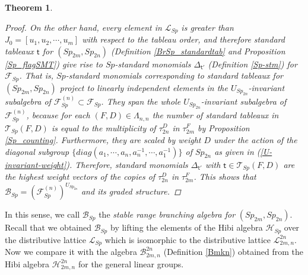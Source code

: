 \documentclass[11pt]{amsart}
\numberwithin{equation}{subsection}
\newtheorem{theorem}{Theorem}[subsection]
\begin{document}
\begin{theorem}
\begin{proof}
On the other hand, every element in $\mathcal{L}_{Sp}$ is greater than 
$J_{0}=[u_1,u_2,\cdots ,u_m]$ with respect to the tableau order, and therefore standard tableaux 
$\mathsf{t}$ for $({Sp}_{2m},{Sp}_{2n})$ (Definition \ref{BrSp_standardtab} and 
Proposition \ref{Sp_flagSMT}) give rise to ${Sp}$-standard monomials $\Delta_{\mathsf{t}'}$ 
(Definition \ref{Sp-stm}) for $\mathcal{F}_{{Sp}}$. That is, $Sp$-standard monomials 
corresponding to standard tableaux for 
$({Sp}_{2m},{Sp}_{2n})$ project to linearly independent elements in the $U_{Sp_{2n}}$-invariant
subalgebra of $\mathcal{F}_{{Sp}}^{(n)}  \subset \mathcal{F}_{{Sp}}$. They span the whole
$U_{Sp_{2n}}$-invariant subalgebra of $\mathcal{F}_{{Sp}}^{(n)}$, because for each 
$(F,D)\in \Lambda _{n,n}$ the number of standard tableaux in $\mathcal{T}_{Sp}(F,D)$ is equal 
to the multiplicity of $\tau _{2n}^{D}$ in $\tau _{2m}^{F}$ by 
Proposition \ref{Sp_counting}. Furthermore, they are scaled by weight $D$ under 
the action of the diagonal subgroup 
$\{diag(a_{1},\cdots ,a_{n},a_{n}^{-1},\cdots ,a_{1}^{-1})\}$ of ${Sp}_{2n}$ as 
given in (\ref{U-invariant-weight}).
Therefore, standard monomials $\Delta _{\mathsf{t}'}$ with 
$\mathsf{t}\in \mathcal{T}_{Sp}(F,D)$ are the highest weight vectors of the
copies of $\tau _{2n}^{D}$ in $\tau _{2m}^{F}$. This shows that
$\mathcal{B}_{Sp} = \left( \mathcal{F}_{{Sp}}^{(n)}\right) ^{U_{{Sp}_{2n}}}$ and
its graded structure.
\end{proof}
\end{theorem}


In this sense, we call $\mathcal{B}_{Sp}$ the \textit{stable range branching algebra for} 
$({Sp}_{2m}, {Sp}_{2n})$. Recall that we obtained $\mathcal{B}_{Sp}$ by lifting 
the elements of the Hibi algebra $\mathcal{H}_{Sp}$ over the distributive lattice 
$\mathcal{L}_{Sp}$ which is isomorphic to the distributive lattice 
$\mathcal{L}_{2m, n}^{2n}$. Now we compare it with the algebra 
$\mathcal{B}_{2m,n}^{2n}$ (Definition \ref{Bmkn}) obtained from the Hibi algebra 
$\mathcal{H}_{2m,n}^{2n}$ for the general linear groups.
\end{document}
